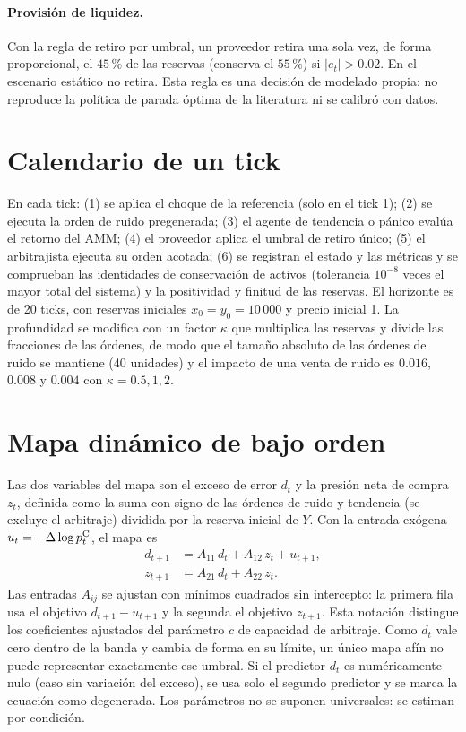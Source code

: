 \paragraph{Provisión de liquidez.} Con la regla de retiro por umbral, un proveedor retira una sola vez, de forma proporcional, el $45\,\%$ de las reservas (conserva el $55\,\%$) si $|e_t|>0.02$. En el escenario estático no retira. Esta regla es una decisión de modelado propia: no reproduce la política de parada óptima de la literatura \cite{bergault2025exit} ni se calibró con datos.

\section{Calendario de un tick}

En cada tick: (1) se aplica el choque de la referencia (solo en el tick 1); (2) se ejecuta la orden de ruido pregenerada; (3) el agente de tendencia o pánico evalúa el retorno del AMM; (4) el proveedor aplica el umbral de retiro único; (5) el arbitrajista ejecuta su orden acotada; (6) se registran el estado y las métricas y se comprueban las identidades de conservación de activos (tolerancia $10^{-8}$ veces el mayor total del sistema) y la positividad y finitud de las reservas. El horizonte es de 20 ticks, con reservas iniciales $x_0=y_0=10\,000$ y precio inicial 1. La profundidad se modifica con un factor $\kappa$ que multiplica las reservas y divide las fracciones de las órdenes, de modo que el tamaño absoluto de las órdenes de ruido se mantiene (40 unidades) y el impacto de una venta de ruido es $0.016$, $0.008$ y $0.004$ con $\kappa=0.5,1,2$.

\section{Mapa dinámico de bajo orden}

Las dos variables del mapa son el exceso de error $d_t$ y la presión neta de compra $z_t$, definida como la suma con signo de las órdenes de ruido y tendencia (se excluye el arbitraje) dividida por la reserva inicial de $Y$. Con la entrada exógena $u_t=-\Delta\log p^{\mathrm{C}}_t$, el mapa es
\begin{align}
  d_{t+1} &= A_{11}\,d_t + A_{12}\,z_t + u_{t+1}, \label{eq:mapa-d}\\
  z_{t+1} &= A_{21}\,d_t + A_{22}\,z_t. \label{eq:mapa-z}
\end{align}
Las entradas $A_{ij}$ se ajustan con mínimos cuadrados sin intercepto: la primera fila usa el objetivo $d_{t+1}-u_{t+1}$ y la segunda el objetivo $z_{t+1}$. Esta notación distingue los coeficientes ajustados del parámetro $c$ de capacidad de arbitraje. Como $d_t$ vale cero dentro de la banda y cambia de forma en su límite, un único mapa afín no puede representar exactamente ese umbral. Si el predictor $d_t$ es numéricamente nulo (caso sin variación del exceso), se usa solo el segundo predictor y se marca la ecuación como degenerada. Los parámetros no se suponen universales: se estiman por condición.


